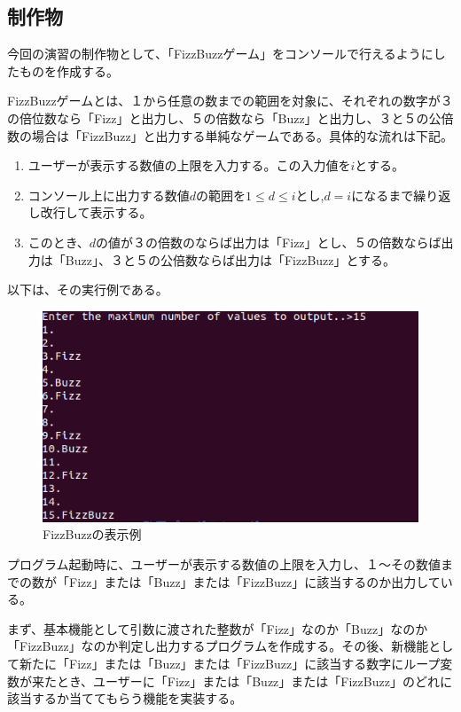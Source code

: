 \documentclass[dvipdfmx]{jsarticle}
\begin{document}
\subsection{制作物}
今回の演習の制作物として、「FizzBuzzゲーム」をコンソールで行えるようにしたものを作成する。\par
FizzBuzzゲームとは、１から任意の数までの範囲を対象に、それぞれの数字が３の倍位数なら「Fizz」と出力し、５の倍数なら「Buzz」と出力し、３と５の公倍数の場合は「FizzBuzz」と出力する単純なゲームである。具体的な流れは下記。
\begin{enumerate}
  \item ユーザーが表示する数値の上限を入力する。この入力値を$i$とする。
  \item コンソール上に出力する数値$d$の範囲を$1 \leq d \leq i$とし,$d = i$になるまで繰り返し改行して表示する。
  \item このとき、$d$の値が３の倍数のならば出力は「Fizz」とし、５の倍数ならば出力は「Buzz」、３と５の公倍数ならば出力は「FizzBuzz」とする。
\end{enumerate}
以下は、その実行例である。
\begin{figure}[H]
  \centering
  \includegraphics[scale=0.6]{ImgMovies/FizzBuzzEx.png}
  \caption{FizzBuzzの表示例}
\end{figure}
プログラム起動時に、ユーザーが表示する数値の上限を入力し、１〜その数値までの数が「Fizz」または「Buzz」または「FizzBuzz」に該当するのか出力している。\par
まず、基本機能として引数に渡された整数が「Fizz」なのか「Buzz」なのか「FizzBuzz」なのか判定し出力するプログラムを作成する。その後、新機能として新たに「Fizz」または「Buzz」または「FizzBuzz」に該当する数字にループ変数が来たとき、ユーザーに「Fizz」または「Buzz」または「FizzBuzz」のどれに該当するか当ててもらう機能を実装する。\par
\end{document}
